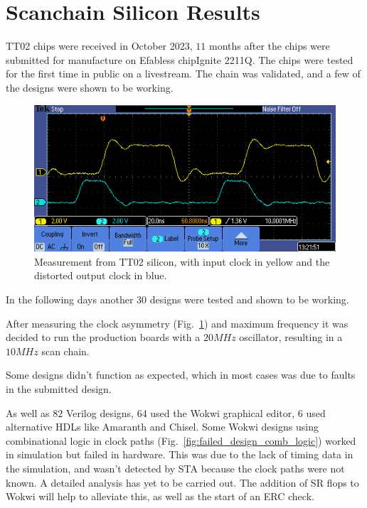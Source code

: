 \section{Scanchain Silicon Results}
\label{sec:scan_chain_res}

TT02 chips were received in October 2023, \(11\) months after the chips were submitted for manufacture on Efabless chipIgnite 2211Q.
The chips were tested for the first time in public on a livestream\cite{siliconalive}.
The chain was validated, and a few of the designs were shown to be working.

\begin{figure}[htp]
\centering
\includegraphics[width=\columnwidth]{./Figs/tt02_clock_out.png}
\caption{Measurement from TT02 silicon, with input clock in yellow and the distorted output clock in blue.}
\label{fig:TT02_clock_out}
\end{figure}

In the following days another \(30\) designs were tested and shown to be working.

After measuring the clock asymmetry (Fig.~\ref{fig:TT02_clock_out}) and maximum frequency it was decided to run the production boards with a \(20MHz\) oscillator, resulting in a \(10MHz\) scan chain.

Some designs didn’t function as expected, which in most cases was due to faults in the submitted design.

As well as \(82\) Verilog designs, \(64\) used the Wokwi graphical editor, \(6\) used alternative HDLs like Amaranth\cite{amaranth} and Chisel\cite{chisel}.
Some Wokwi designs using combinational logic in clock paths (Fig.~\ref{fig:failed_design_comb_logic}) worked in simulation but failed in hardware.
This was due to the lack of timing data in the simulation, and wasn’t detected by STA because the clock paths were not known.
A detailed analysis has yet to be carried out.
The addition of SR flops to Wokwi will help to alleviate this, as well as the start of an ERC check.

